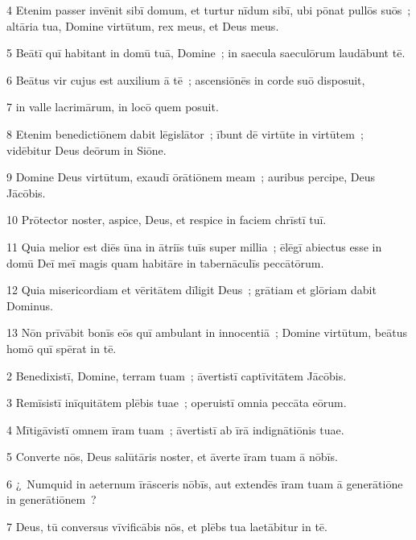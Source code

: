 \psalmVerse
  {\phantom{00}4}
  {Etenim passer invēnit sibī domum, et turtur nīdum sibī, ubi pōnat pullōs suōs~; altāria tua, Domine virtūtum, rex meus, et Deus meus.}


\psalmVerse
  {\phantom{00}5}
  {Beātī quī habitant in domū tuā, Domine~; in saecula saeculōrum laudābunt tē.}


\psalmVerse
  {\phantom{00}6}
  {Beātus vir cujus est auxilium ā tē~; ascensiōnēs in corde suō disposuit,}


\psalmVerse
  {\phantom{00}7}
  {in valle lacrimārum, in locō quem posuit.}


\psalmVerse
  {\phantom{00}8}
  {Etenim benedictiōnem dabit lēgislātor~; ībunt dē virtūte in virtūtem~; vidēbitur Deus deōrum in Siōne.}


\psalmVerse
  {\phantom{00}9}
  {Domine Deus virtūtum, exaudī ōrātiōnem meam~; auribus percipe, Deus Jācōbis.}


\psalmVerse
  {\phantom{0}10}
  {Prōtector noster, aspice, Deus, et respice in faciem chrīstī tuī.}


\psalmVerse
  {\phantom{0}11}
  {Quia melior est diēs ūna in ātriīs tuīs super millia~; ēlēgī abiectus esse in domū Deī meī magis quam habitāre in tabernāculīs peccātōrum.}


\psalmVerse
  {\phantom{0}12}
  {Quia misericordiam et vēritātem dīligit Deus~; grātiam et glōriam dabit Dominus.}


\psalmVerse
  {\phantom{0}13}
  {Nōn prīvābit bonīs eōs quī ambulant in innocentiā~; Domine virtūtum, beātus homō quī spērat in tē.}



\psalmVerse
  {\phantom{00}2}
  {Benedixistī, Domine, terram tuam~; āvertistī captīvitātem Jācōbis.}


\psalmVerse
  {\phantom{00}3}
  {Remīsistī inīquitātem plēbis tuae~; operuistī omnia peccāta eōrum.}


\psalmVerse
  {\phantom{00}4}
  {Mītigāvistī omnem īram tuam~; āvertistī ab īrā indignātiōnis tuae.}


\psalmVerse
  {\phantom{00}5}
  {Converte nōs, Deus salūtāris noster, et āverte īram tuam ā nōbīs.}


\psalmVerse
  {\phantom{00}6}
  {¿~Numquid in aeternum īrāsceris nōbīs, aut extendēs īram tuam ā generātiōne in generātiōnem~?}


\psalmVerse
  {\phantom{00}7}
  {Deus, tū conversus vīvificābis nōs, et plēbs tua laetābitur in tē.}


